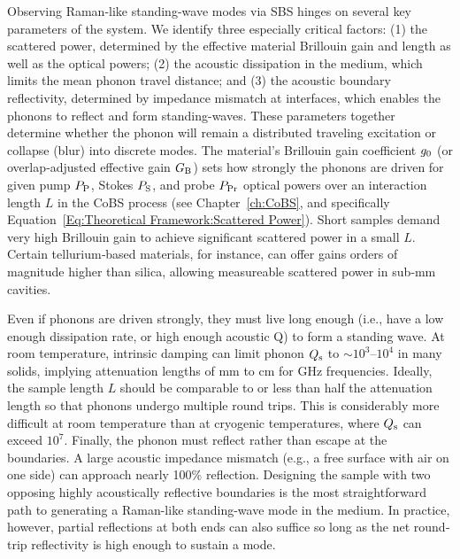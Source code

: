 Observing Raman-like standing-wave modes via \ac{SBS} hinges on several key parameters of the system. We identify three especially critical factors: (1) the scattered power, determined by the effective material Brillouin gain and length as well as the optical powers; (2) the acoustic dissipation in the medium, which limits the mean phonon travel distance; and (3) the acoustic boundary reflectivity, determined by impedance mismatch at interfaces, which enables the phonons to reflect and form standing-waves. These parameters together determine whether the phonon will remain a distributed traveling excitation or collapse (blur) into discrete modes. The material’s Brillouin gain coefficient \(g_{\rm 0}\) (or overlap‐adjusted effective gain \(G_{\rm B}\)) sets how strongly the phonons are driven for given pump \(P_{\rm P}\), Stokes \(P_{\rm S}\), and probe \(P_{\rm Pr}\) optical powers over an interaction length \(L\) in the \ac{CoBS} process (see Chapter~\ref{ch:CoBS}, and specifically Equation~\ref{Eq:Theoretical Framework:Scattered Power}).  Short samples demand very high Brillouin gain to achieve significant scattered power in a small \(L\). Certain tellurium‐based materials, for instance, can offer gains orders of magnitude higher than silica, \cite{sanghera2010nonlinear, abedin2005observation} allowing measureable scattered power in sub‐\si{\milli\meter} cavities.

Even if phonons are driven strongly, they must live long enough (i.e., have a low enough dissipation rate, or high enough acoustic Q) to form a standing wave. At room temperature, intrinsic damping can limit phonon \(Q_{\rm s}\) to \(\sim 10^{3}\)–\(10^{4}\) in many solids, \cite{heiman1979brillouin, bucaro1974high} implying attenuation lengths of \si{\milli\meter} to \si{\centi\meter} for \si{\giga\hertz} frequencies. Ideally, the sample length \(L\) should be comparable to or less than half the attenuation length so that phonons undergo multiple round trips. This is considerably more difficult at room temperature than at cryogenic temperatures, where \(Q_{\rm s}\) can exceed \(10^{7}\). \cite{maris1990phonon, renninger2018bulk} Finally, the phonon must reflect rather than escape at the boundaries. A large acoustic impedance mismatch (e.g., a free surface with air on one side) can approach nearly 100\% reflection. \cite{galliou2013extremely, auld1973acoustic} Designing the sample with two opposing highly acoustically reflective boundaries is the most straightforward path to generating a Raman-like standing-wave mode in the medium. In practice, however, partial reflections at both ends can also suffice so long as the net round‐trip reflectivity is high enough to sustain a mode.

